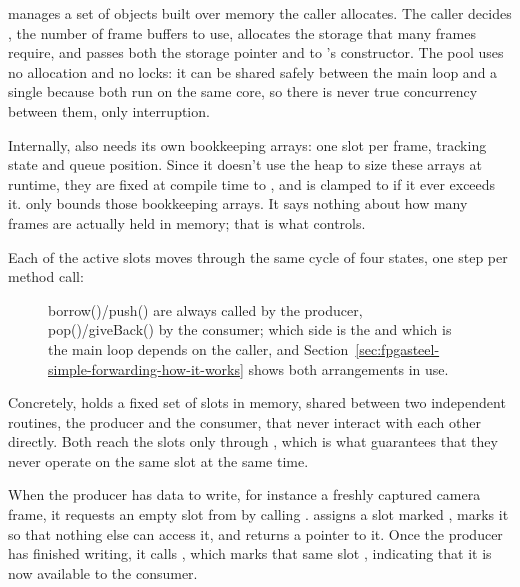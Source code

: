  manages a set of  objects built over memory the caller allocates. The caller decides , the number of frame buffers to use, allocates the storage that many frames require, and passes both the storage pointer and  to 's constructor. The pool uses no  allocation and no locks: it can be shared safely between the main loop and a single  because both run on the same core, so there is never true concurrency between them, only interruption.

Internally,  also needs its own bookkeeping arrays: one slot per frame, tracking state and queue position. Since it doesn't use the heap to size these arrays at runtime, they are fixed at compile time to , and  is clamped to  if it ever exceeds it.  only bounds those bookkeeping arrays. It says nothing about how many frames are actually held in memory; that is what  controls.

Each of the  active slots moves through the same cycle of four states, one step per method call:

\begin{landscape}
\begin{figure}[p]
    \centering
    
    \caption{borrow()/push() are always called by the producer, pop()/giveBack() by the consumer; which side is the  and which is the main loop depends on the caller, and Section~\ref{sec:fpgasteel-simple-forwarding-how-it-works} shows both arrangements in use.}
    \label{fig:fpgasteel-framepool-states}
\end{figure}
\end{landscape}

Concretely,  holds a fixed set of  slots in memory, shared between two independent routines, the producer and the consumer, that never interact with each other directly. Both reach the slots only through , which is what guarantees that they never operate on the same slot at the same time.

When the producer has data to write, for instance a freshly captured camera frame, it requests an empty slot from  by calling .  assigns a slot marked , marks it  so that nothing else can access it, and returns a pointer to it. Once the producer has finished writing, it calls , which marks that same slot , indicating that it is now available to the consumer.

